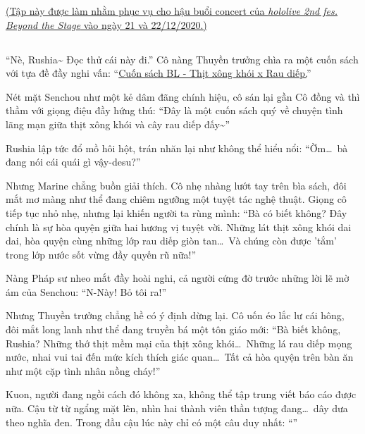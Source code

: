 \documentclass[../main.tex]{subfiles}
\begin{document}
\begin{center}
  \uline{(Tập này được làm nhằm phục vụ cho hậu buổi concert của \textit{hololive 2nd fes. Beyond the Stage} vào ngày 21 và 22/12/2020.)}
\end{center}

\subsection*{\label{ep-S13.I}}

``Nè, Rushia\~{} Đọc thử cái này đi.'' Cô nàng Thuyền trưởng chìa ra một cuốn sách với tựa đề đầy nghi vấn: ``\uline{Cuốn sách BL - Thịt xông khói x Rau diếp.}''


Nét mặt Senchou như một kẻ dâm đãng chính hiệu, cô sán lại gần Cô đồng và thì thầm với giọng điệu đầy hứng thú: ``Đây là một cuốn sách quý về chuyện tình lãng mạn giữa thịt xông khói và cây rau diếp đấy\~{}''

Rushia lập tức đổ mồ hôi hột, trán nhăn lại như không thể hiểu nổi: ``Ờm\dots\ bà đang nói cái quái gì vậy-desu?''

Nhưng Marine chẳng buồn giải thích. Cô nhẹ nhàng lướt tay trên bìa sách, đôi mắt mơ màng như thể đang chiêm ngưỡng một tuyệt tác nghệ thuật. Giọng cô tiếp tục nhỏ nhẹ, nhưng lại khiến người ta rùng mình: ``Bà có biết không? Đây chính là sự hòa quyện giữa hai hương vị tuyệt vời. Những lát thịt xông khói dai dai, hòa quyện cùng những lớp rau diếp giòn tan\dots\ Và chúng còn được 'tắm' trong lớp nước sốt vừng đầy quyến rũ nữa!''

Nàng Pháp sư nheo mắt đầy hoài nghi, cả người cứng đờ trước những lời lẽ mờ ám của Senchou: ``N-Này! Bỏ tôi ra!''

Nhưng Thuyền trưởng chẳng hề có ý định dừng lại. Cô uốn éo lắc lư cái hông, đôi mắt long lanh như thể đang truyền bá một tôn giáo mới: ``Bà biết không, Rushia? Những thớ thịt mềm mại của thịt xông khói\dots\ Những lá rau diếp mọng nước, nhai vui tai đến mức kích thích giác quan\dots\ Tất cả hòa quyện trên bàn ăn như một cặp tình nhân nồng cháy!''


Kuon, người đang ngồi cách đó không xa, không thể tập trung viết báo cáo được nữa. Cậu từ từ ngẩng mặt lên, nhìn hai thành viên thần tượng đang\dots\ dây dưa theo nghĩa đen. Trong đầu cậu lúc này chỉ có một câu duy nhất: ``''
\end{document}
